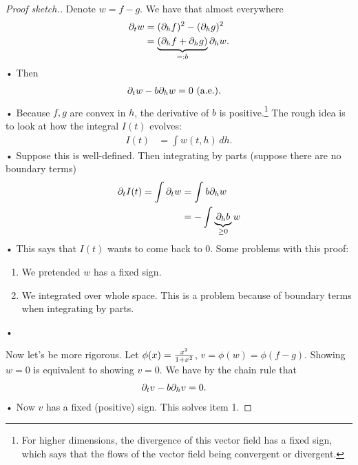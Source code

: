 \begin{proof}[Proof sketch.]
Denote $w=f-g$. We have that almost everywhere
\begin{align*}
\partial_t w&= (\partial_hf)^2 - (\partial_hg)^2\\
&= \underbrace{(\partial_h f+\partial_hg)}_{=:b} \partial_h w.
\end{align*}•
Then 
\begin{align*}
\partial_t w - b\partial_h w&=0\text{ (a.e.)}.
\end{align*}•
Because $f,g$ are convex in $h$, the derivative of $b$ is positive.\footnote{For higher dimensions, the divergence of this vector field has a fixed sign, which says that the flows of the vector field being convergent or divergent.}
The rough idea is to look at how the integral $I(t)$ evolves:
\begin{align*}
I(t) &= \int w(t,h)\,dh.
\end{align*}•
Suppose this is well-defined. Then integrating by parts (suppose there are no boundary terms)
\begin{align*}
\partial_t I(t) = \int\partial_t w &= \int b \partial_hw\\
&=-\int \underbrace{\partial_h b}_{\ge0} w
\end{align*}•
This says that $I(t)$ wants to come back to 0.
Some problems with this proof:
\begin{enumerate}
\item
We pretended $w$ has a fixed sign.
\item We integrated over whole space. This is a problem because of boundary terms when integrating by parts.
\end{enumerate}•

Now let's be more rigorous. Let $\phi(x) = \frac{x^2}{1+x^2}$, $v=\phi(w)=\phi(f-g)$. Showing $w=0$ is equivalent to showing $v=0$. We have by the chain rule that %
\begin{align*}
\partial_t v - b\partial_h v&=0.
\end{align*}•
Now $v$ has a fixed (positive) sign. This solves item 1.


\end{proof}
